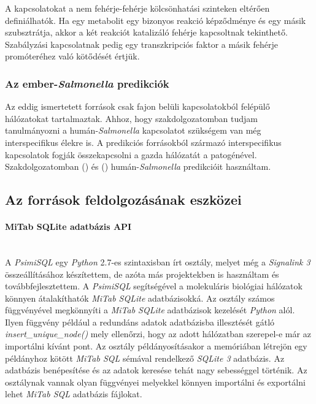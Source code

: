 \documentclass[a4paper,12pt]{article}
\begin{document}
			A kapcsolatokat a nem fehérje-fehérje kölcsönhatási szinteken eltérően definiálhatók. Ha egy metabolit egy bizonyos reakció képződménye és egy másik szubsztrátja, akkor a két reakciót katalizáló fehérje kapcsoltnak tekinthető. Szabályzási kapcsolatnak pedig egy transzkripciós faktor a másik fehérje promóteréhez való kötődését értjük. 
			
			\subsubsection{Az ember-\textit{Salmonella} predikciók}
			Az eddig ismertetett források csak fajon belüli kapcsolatokból felépülő hálózatokat tartalmaztak. Ahhoz, hogy szakdolgozatomban tudjam tanulmányozni a humán-\textit{Salmonella} kapcsolatot szükségem van még interspecifikus élekre is. A predikciós forrásokból származó interspecifikus kapcsolatok fogják összekapcsolni a gazda hálózatát a patogénével. Szakdolgozatomban (\cite{Krishnadev}) és (\cite{Kshirsagar}) humán-\textit{Salmonella} predikcióit használtam.
			

		
		\subsection{Az források feldolgozásának eszközei}
		
			\paragraph{MiTab SQLite adatbázis API} \mbox{}\\
			A \textit{PsimiSQL} egy \textit{Python} 2.7-es szintaxisban írt osztály, melyet még a \textit{Signalink 3} összeállításához készítettem, de azóta más projektekben is használtam és továbbfejlesztettem. A \textit{PsimiSQL} segítségével a molekuláris biológiai hálózatok könnyen átalakíthatók \textit{MiTab SQLite} adatbázisokká. Az osztály számos függvényével megkönnyíti a \textit{MiTab SQLite} adatbázisok kezelését \textit{Python} alól. Ilyen függvény például a redundáns adatok adatbázisba illesztését gátló \textit{insert\_unique\_node()} mely ellenőrzi, hogy az adott hálózatban szerepel-e már az importálni kívánt pont. Az osztály példányosításakor a memóriában létrejön egy példányhoz kötött \textit{MiTab SQL} sémával rendelkező \textit{SQLite 3} adatbázis. Az adatbázis benépesítése és az adatok keresése tehát nagy sebességgel történik. Az osztálynak vannak olyan függvényei melyekkel könnyen importálni és exportálni lehet \textit{MiTab SQL} adatbázis fájlokat.
			
\end{document}
